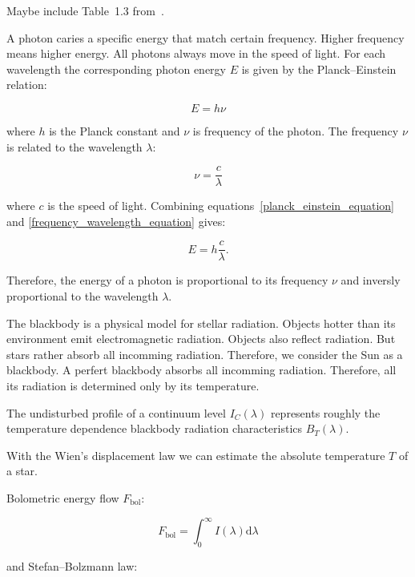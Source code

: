 \documentclass[thesis=M,english]{FITthesis}[2012/10/20]
\begin{document}
Maybe include Table~1.3 from~\cite{trypsteen2017}.

A photon caries a specific energy that match certain frequency.
Higher frequency means higher energy.
All photons always move in the speed of light.
For each wavelength the corresponding photon energy \(E\) is given by the Planck--Einstein relation:

\begin{equation}
	E = h \nu \label{planck_einstein_equation}
\end{equation}

where \(h\) is the Planck constant and \(\nu\) is frequency of the photon.
The frequency \(\nu\) is related to the wavelength \(\lambda\):

\begin{equation}
	\nu = \frac{c}{\lambda} \label{frequency_wavelength_equation}
\end{equation}

where \(c\) is the speed of light.
Combining equations~\ref{planck_einstein_equation} and \ref{frequency_wavelength_equation} gives:

\begin{equation}
	E = h \frac{c}{\lambda}.
\end{equation}

Therefore, the energy of a photon is proportional to its frequency \(\nu\)
and inversly proportional to the wavelength \(\lambda\).~\cite{trypsteen2017}

The blackbody is a physical model for stellar radiation.
Objects hotter than its environment emit electromagnetic radiation.
Objects also reflect radiation.
But stars rather absorb all incomming radiation.
Therefore, we consider the Sun as a blackbody.
A perfert blackbody absorbs all incomming radiation.
Therefore, all its radiation is determined only by its temperature.~\cite{trypsteen2017}

The undisturbed profile of a continuum level \(I_C(\lambda)\) represents roughly the temperature dependence blackbody radiation characteristics \(B_T(\lambda)\).

With the Wien's displacement law we can estimate the absolute temperature \(T\) of a star.

Bolometric energy flow \(F_{\mathrm{bol}}\):

\begin{equation}
	F_{\mathrm{bol}} = \int_0^{\infty} I(\lambda) \mathrm{d} \lambda
\end{equation}

and Stefan--Bolzmann law:
\end{document}
